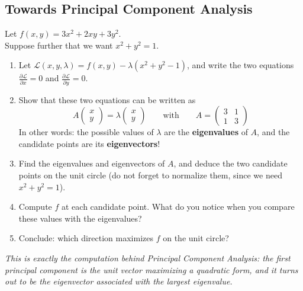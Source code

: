 \documentclass[]{article}
\begin{document}
	\subsection{Towards Principal Component Analysis}
	Let $f(x,y) = 3x^2 + 2xy + 3y^2$.\\
	Suppose further that we want $x^2 + y^2 = 1$.

	\begin{enumerate}
		\item Let $\mathcal{L}(x,y,\lambda) = f(x,y) - \lambda(x^2 + y^2 - 1)$, and write the two equations $\frac{\partial \mathcal{L}}{\partial x} = 0$ and $\frac{\partial \mathcal{L}}{\partial y} = 0$.
		\item Show that these two equations can be written as
		$$A \begin{pmatrix} x \\ y \end{pmatrix} = \lambda \begin{pmatrix} x \\ y \end{pmatrix}
		\qquad \text{with} \qquad
		A = \begin{pmatrix} 3 & 1 \\ 1 & 3 \end{pmatrix}$$
		In other words: the possible values of $\lambda$ are the \textbf{eigenvalues} of $A$, and the candidate points are its \textbf{eigenvectors}!
		\item Find the eigenvalues and eigenvectors of $A$, and deduce the two candidate points on the unit circle (do not forget to normalize them, since we need $x^2+y^2=1$).
		\item Compute $f$ at each candidate point.
		What do you notice when you compare these values with the eigenvalues?
		\item Conclude: which direction maximizes $f$ on the unit circle?
	\end{enumerate}
	\textit{This is exactly the computation behind Principal Component Analysis: the first principal component is the unit vector maximizing a quadratic form, and it turns out to be the eigenvector associated with the largest eigenvalue.}
\end{document}
